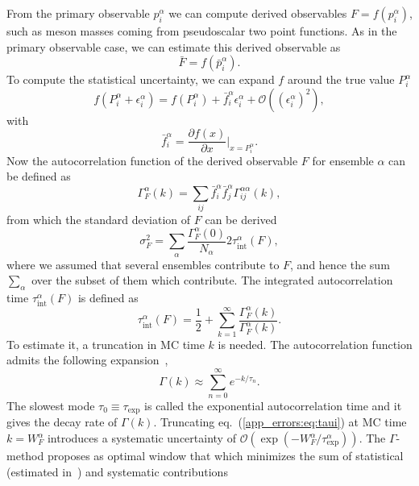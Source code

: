 From the primary observable $p_i^{\alpha}$ we can compute derived observables $F=f(p_i^{\alpha})$, such as meson masses coming from pseudoscalar two point functions. As in the primary observable case, we can estimate this derived observable as
\begin{equation}
\bar{F}=f(\bar{p}_i^{\alpha}).
\end{equation}
To compute the statistical uncertainty, we can expand $f$ around the true value $P_i^{\alpha}$
\begin{equation}
f(P_{i}^{\alpha}+\epsilon_{i}^{\alpha})=f(P_{i}^{\alpha})+\bar{f}_i^{\alpha}\epsilon_{i}^{\alpha}+\mathcal{O}((\epsilon_{i}^{\alpha})^2),
\end{equation}
with
\begin{equation}
\bar{f}_i^{\alpha}=\frac{\partial f(x)}{\partial x}|_{x=P_{i}^{\alpha}}.
\end{equation}
Now the autocorrelation function of the derived observable $F$ for ensemble $\alpha$ can be defined as
\begin{equation}
\Gamma_F^{\alpha}(k)=\sum_{ij}\bar{f}_i^{\alpha}\bar{f}_j^{\alpha}\Gamma_{ij}^{\alpha\alpha}(k),
\end{equation}
from which the standard deviation of $F$ can be derived
\begin{equation}
\sigma_F^2=\sum_{\alpha}\frac{\Gamma_F^{\alpha}(0)}{N_{\alpha}}2\tau_{\textrm{int}}^{\alpha}(F),
\end{equation}
where we assumed that several ensembles contribute to $F$, and hence the sum $\sum_{\alpha}$ over the subset of them which contribute. The integrated autocorrelation time $\tau_{\textrm{int}}^{\alpha}(F)$ is defined as
\begin{equation}
\label{app_errors:eq:taui}
\tau_{\textrm{int}}^{\alpha}(F)=\frac{1}{2}+\sum_{k=1}^{\infty}\frac{\Gamma_F^{\alpha}(k)}{\Gamma_F^{\alpha}(k)}.
\end{equation}
To estimate it, a truncation in MC time $k$ is needed. The autocorrelation function admits the following expansion~\citep{Luscher:2011kk},\citep{Schaefer:2010hu}
\begin{equation}
\Gamma(k)\approx\sum_{n=0}^{\infty}e^{-k/\tau_n}.
\end{equation}
The slowest mode $\tau_0\equiv\tau_{\textrm{exp}}$ is called the exponential autocorrelation time and it gives the decay rate of $\Gamma(k)$. Truncating eq.~(\ref{app_errors:eq:taui}) at MC time $k=W_F^{\alpha}$ introduces a systematic uncertainty of $\mathcal{O}(\exp(-W_F^{\alpha}/\tau_{\textrm{exp}}^{\alpha}))$. The $\Gamma$-method proposes as optimal window that which minimizes the sum of statistical (estimated in~\citep{Madras:1988ei}) and systematic contributions
